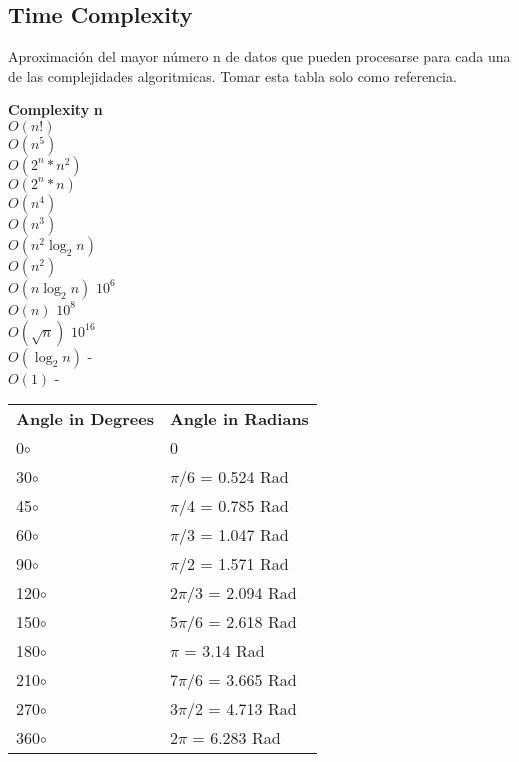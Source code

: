 \documentclass[10pt,letterpaper,twocolumn,twosided]{article}
\begin{document}
\subsection{Time Complexity}

Aproximación del mayor número n de datos que pueden procesarse para cada una de las complejidades algoritmicas. Tomar esta tabla solo como referencia.

\begin{tabbing}
\textbf{Complexity}\hspace{4cm} \=  \textbf{n}\hspace{3cm}   \\ 
$O(n!)$ \\ 
$O(n^{5})$ \\ 
$O(2^{n}*n^{2})$ \\ 
$O(2^{n}*n)$ \\ 
$O(n^{4})$ \\ 
$O(n^{3})$ \\ 
$O(n^{2}\log_{2}n)$ \\ 
$O(n^{2})$ \\ 
$O(n\log_{2}n)$ \> $10^{6}$\\ 
$O(n)$ \> $10^{8}$\\ 
$O(\sqrt{n})$ \> $10^{16}$\\ 
$O(\log_{2}n)$ \> -\\ 
$O(1)$ \> -\\ 
\end{tabbing}

\begin{table}
\centering
\begin{tabular}{ll}
\textbf{Angle in Degrees} & \textbf{Angle in Radians}  \\
0$\circ$        & 0                             \\
30$\circ$       & $\pi$/6 = 0.524 Rad            \\
45$\circ$       & $\pi$/4 = 0.785 Rad            \\
60$\circ$       & $\pi$/3 = 1.047 Rad            \\
90$\circ$       & $\pi$/2 = 1.571 Rad            \\
120$\circ$      & 2$\pi$/3 = 2.094 Rad           \\
150$\circ$      & 5$\pi$/6 = 2.618 Rad           \\
180$\circ$      & $\pi$ = 3.14 Rad               \\
210$\circ$      & 7$\pi$/6 = 3.665 Rad           \\
270$\circ$      & 3$\pi$/2 = 4.713 Rad           \\
360$\circ$      & 2$\pi$ = 6.283 Rad            
\end{tabular}
\end{table}
\end{document}
